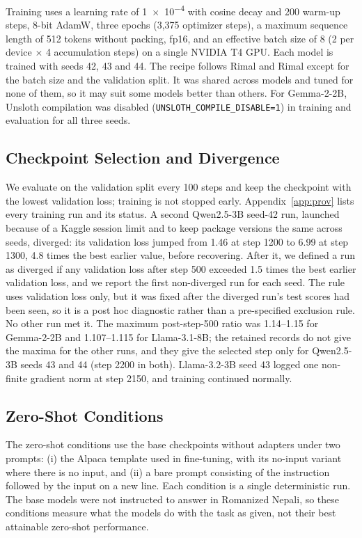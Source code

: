 \documentclass{article}
\begin{document}
Training uses a learning rate of 1~$\times$~10\textsuperscript{$-$4} with cosine decay and 200 warm-up steps, 8-bit AdamW, three epochs (3,375 optimizer steps), a maximum sequence length of 512 tokens without packing, fp16, and an effective batch size of 8 (2 per device $\times$ 4 accumulation steps) on a single NVIDIA T4 GPU. Each model is trained with seeds 42, 43 and 44. The recipe follows Rimal and Rimal \citep{rimal2026} except for the batch size and the validation split. It was shared across models and tuned for none of them, so it may suit some models better than others. For Gemma-2-2B, Unsloth compilation was disabled (\texttt{UNSLOTH\_COMPILE\_DISABLE=1}) in training and evaluation for all three seeds.

\subsection{Checkpoint Selection and Divergence}\label{sec:ckpt}

We evaluate on the validation split every 100 steps and keep the checkpoint with the lowest validation loss; training is not stopped early. Appendix~\ref{app:prov} lists every training run and its status. A second Qwen2.5-3B seed-42 run, launched because of a Kaggle session limit and to keep package versions the same across seeds, diverged: its validation loss jumped from 1.46 at step 1200 to 6.99 at step 1300, 4.8 times the best earlier value, before recovering. After it, we defined a run as diverged if any validation loss after step 500 exceeded 1.5 times the best earlier validation loss, and we report the first non-diverged run for each seed. The rule uses validation loss only, but it was fixed after the diverged run's test scores had been seen, so it is a post hoc diagnostic rather than a pre-specified exclusion rule. No other run met it. The maximum post-step-500 ratio was 1.14–1.15 for Gemma-2-2B and 1.107–1.115 for Llama-3.1-8B; the retained records do not give the maxima for the other runs, and they give the selected step only for Qwen2.5-3B seeds 43 and 44 (step 2200 in both). Llama-3.2-3B seed 43 logged one non-finite gradient norm at step 2150, and training continued normally.

\subsection{Zero-Shot Conditions}\label{sec:zeroshot}

The zero-shot conditions use the base checkpoints without adapters under two prompts: (i) the Alpaca template used in fine-tuning, with its no-input variant where there is no input, and (ii) a bare prompt consisting of the instruction followed by the input on a new line. Each condition is a single deterministic run. The base models were not instructed to answer in Romanized Nepali, so these conditions measure what the models do with the task as given, not their best attainable zero-shot performance.
\end{document}
